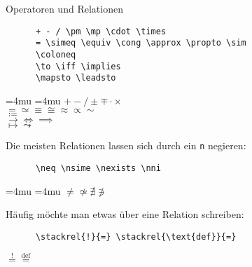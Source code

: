 \begin{frame}[fragile]{Operatoren und Relationen}
  \vspace{-1em}
  \begin{CodeExample}{0.74}
    \begin{lstlisting}
      + - / \pm \mp \cdot \times
      = \simeq \equiv \cong \approx \propto \sim
      \coloneq
      \to \iff \implies
      \mapsto \leadsto
    \end{lstlisting}
  \CodeResult
    \Umathbinbinspacing\textstyle=4mu
    \Umathrelrelspacing\textstyle=4mu
    $+ - / \pm \mp \cdot \times$ \\
    $= \simeq \equiv \cong \approx \propto \sim$ \\
    $\coloneq$ \\
    $\to \iff \implies$ \\
    $\mapsto \leadsto$
  \end{CodeExample}
  Die meisten Relationen lassen sich durch ein \texttt{n} negieren:
  \vspace{-1em}
  \begin{CodeExample}{0.74}
    \begin{lstlisting}
      \neq \nsime \nexists \nni
    \end{lstlisting}
  \CodeResult
    \Umathbinbinspacing\textstyle=4mu
    \Umathrelrelspacing\textstyle=4mu
  $\neq \nsime \nexists \nni$
  \end{CodeExample}
  Häufig möchte man etwas über eine Relation schreiben:
  \vspace{-1em}
  \begin{CodeExample}{0.74}
    \begin{lstlisting}
      \stackrel{!}{=} \stackrel{\text{def}}{=}
    \end{lstlisting}
  \CodeResult
    $\stackrel{!}{=} \stackrel{\text{def}}{=}$
  \end{CodeExample}
\end{frame}

